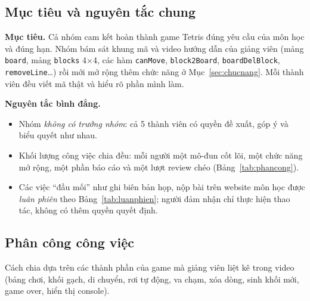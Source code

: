 \documentclass[13pt,a4paper]{extarticle}
\begin{document}
\subsection{Mục tiêu và nguyên tắc chung}
\textbf{Mục tiêu.} Cả nhóm cam kết hoàn thành game Tetris đúng yêu cầu của môn học và đúng hạn. Nhóm bám sát khung mã và video hướng dẫn của giảng viên (mảng \texttt{board}, mảng \texttt{blocks} 4$\times$4, các hàm \texttt{canMove}, \texttt{block2Board}, \texttt{boardDelBlock}, \texttt{removeLine}\ldots) rồi mới mở rộng thêm chức năng ở Mục~\ref{sec:chucnang}. Mỗi thành viên đều viết mã thật và hiểu rõ phần mình làm.

\textbf{Nguyên tắc bình đẳng.}
\begin{itemize}
  \item Nhóm \emph{không có trưởng nhóm}: cả 5 thành viên có quyền đề xuất, góp ý và biểu quyết như nhau.
  \item Khối lượng công việc chia đều: mỗi người một mô-đun cốt lõi, một chức năng mở rộng, một phần báo cáo và một lượt review chéo (Bảng~\ref{tab:phancong}).
  \item Các việc ``đầu mối'' như ghi biên bản họp, nộp bài trên website môn học được \emph{luân phiên} theo Bảng~\ref{tab:luanphien}; người đảm nhận chỉ thực hiện thao tác, không có thêm quyền quyết định.
\end{itemize}

\subsection{Phân công công việc}
Cách chia dựa trên các thành phần của game mà giảng viên liệt kê trong video (bảng chơi, khối gạch, di chuyển, rơi tự động, va chạm, xóa dòng, sinh khối mới, game over, hiển thị console).
\end{document}
